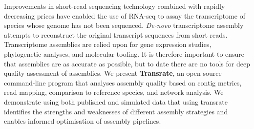 Improvements in short-read sequencing technology combined with rapidly decreasing prices have enabled the use of RNA-seq to assay the transcriptome of species whose genome has not been sequenced. {\it De-novo} transcriptome assembly attempts to reconstruct the original transcript sequences from short reads. Transcriptome assemblies are relied upon for gene expression studies, phylogenetic analyses, and molecular tooling. It is therefore important to ensure that assemblies are as accurate as possible, but to date there are no tools for deep quality assessment of assemblies. We present \textbf{Transrate}, an open source command-line program that analyses assembly quality based on contig metrics, read mapping, comparison to reference species, and network analysis. We demonstrate using both published and simulated data that using transrate identifies the strengths and weaknesses of different assembly strategies and enables informed optimisation of assembly pipelines.